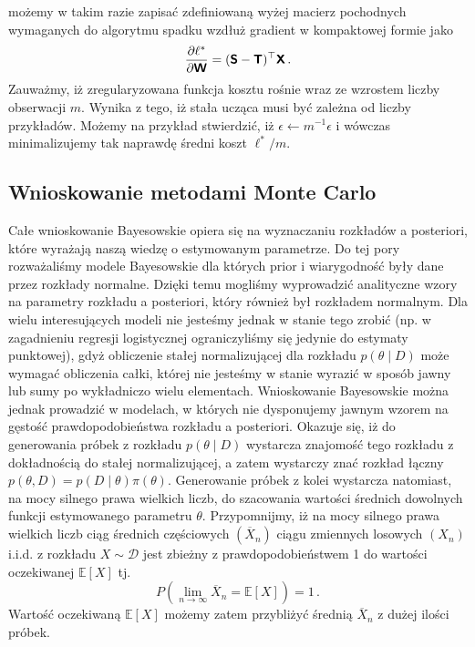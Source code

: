 \documentclass{myclass}
\begin{document}
możemy w takim razie zapisać zdefiniowaną wyżej macierz pochodnych wymaganych do algorytmu spadku
wzdłuż gradient w kompaktowej formie jako
\begin{equation*}
    \pdv{\ell^*}{\boldsymbol{\mathsf{W}}} = (\boldsymbol{\mathsf{S}} - \boldsymbol{\mathsf{T}})^\top\boldsymbol{\mathsf{X}}\,.
\end{equation*}
Zauważmy, iż zregularyzowana funkcja kosztu rośnie wraz ze wzrostem liczby obserwacji \(m\). Wynika
z tego, iż stała ucząca musi być zależna od liczby przykładów. Możemy na przykład stwierdzić, iż
\(\epsilon \leftarrow m^{-1}\epsilon\) i wówczas minimalizujemy tak naprawdę średni koszt \(\ell^* /
m\).

\subsection{Wnioskowanie metodami Monte Carlo}

Całe wnioskowanie Bayesowskie opiera się na wyznaczaniu rozkładów a posteriori, które wyrażają naszą
wiedzę o estymowanym parametrze. Do tej pory rozważaliśmy modele Bayesowskie dla których prior i
wiarygodność były dane przez rozkłady normalne. Dzięki temu mogliśmy wyprowadzić analityczne wzory
na parametry rozkładu a posteriori, który również był rozkładem normalnym. Dla wielu interesujących
modeli nie jesteśmy jednak w stanie tego zrobić (np. w zagadnieniu regresji logistycznej
ograniczyliśmy się jedynie do estymaty punktowej), gdyż obliczenie stałej normalizującej dla
rozkładu \(p(\theta \mid D)\) może wymagać obliczenia całki, której nie jesteśmy w stanie wyrazić w
sposób jawny lub sumy po wykładniczo wielu elementach. Wnioskowanie Bayesowskie można jednak
prowadzić w modelach, w których nie dysponujemy jawnym wzorem na gęstość prawdopodobieństwa rozkładu
a posteriori. Okazuje się, iż do generowania próbek z rozkładu \(p(\theta \mid D)\) wystarcza
znajomość tego rozkładu z dokładnością do stałej normalizującej, a zatem wystarczy znać rozkład
łączny \(p(\theta, D) = p(D\mid\theta)\pi(\theta)\). Generowanie próbek z kolei wystarcza natomiast,
na mocy silnego prawa wielkich liczb, do szacowania wartości średnich dowolnych funkcji estymowanego
parametru \(\theta\). Przypomnijmy, iż na mocy silnego prawa wielkich liczb ciąg średnich
częściowych \((\overline{X}_n)\) ciągu zmiennych losowych \((X_n)\) i.i.d. z rozkładu \(X \sim
\mathcal{D}\) jest zbieżny z prawdopodobieństwem 1 do wartości oczekiwanej \(\mathbb{E}[X]\) tj.
\begin{equation*}
    P\left(\lim_{n \to \infty} \overline{X}_n = \mathbb{E}[X]\right) = 1\,.
\end{equation*}
Wartość oczekiwaną \(\mathbb{E}[X]\) możemy zatem przybliżyć średnią \(\overline{X}_n\) z dużej
ilości próbek.
\end{document}
